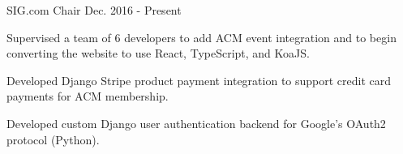 \begin{cventries}
\cventry
  {SIG.com Chair} %
  {} %
  {} %
  {Dec. 2016 - Present} %
  {
    \begin{cvitems} %
      \item {Supervised a team of 6 developers to add ACM event integration and to begin converting the website to use React, TypeScript, and KoaJS.}
      \item {Developed Django Stripe product payment integration to support credit card payments for ACM membership.}
      \item {Developed custom Django user authentication backend for Google's OAuth2 protocol (Python).}
    \end{cvitems}
  }




\end{cventries}
